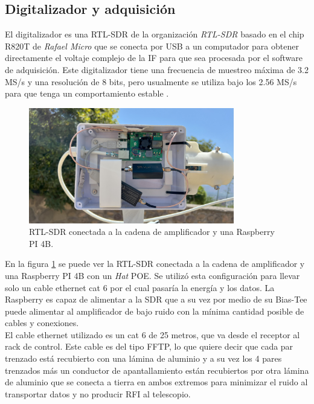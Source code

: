 \subsection{Digitalizador y adquisición}

El digitalizador es una RTL-SDR de la organización \textit{RTL-SDR} basado en el chip R820T de \textit{Rafael Micro} que se conecta por USB a un computador para obtener directamente el voltaje complejo de la IF para que sea procesada por el software de adquisición. Este digitalizador tiene una frecuencia de muestreo máxima de 3.2 MS/s y una resolución de 8 bits, pero usualmente se utiliza bajo los 2.56 MS/s para que tenga un comportamiento estable \cite{RTLSDR2018}.\\

\begin{figure}
    \centering
    \includegraphics[width=0.8\textwidth]{img/rpiRtlSaw}
    \caption{RTL-SDR conectada a la cadena de amplificador y una Raspberry PI 4B.}
    \label{fig:digitalizador}
\end{figure}

En la figura \ref{fig:digitalizador} se puede ver la RTL-SDR conectada a la cadena de amplificador y una Raspberry PI 4B con un \textit{Hat} POE. Se utilizó esta configuración para llevar solo un cable ethernet cat 6 por el cual pasaría la energía y los datos. La Raspberry es capaz de alimentar a la SDR que a su vez por medio de su Bias-Tee puede alimentar al amplificador de bajo ruido con la mínima cantidad posible de cables y conexiones.\\

El cable ethernet utilizado es un cat 6 de 25 metros, que va desde el receptor al rack de control. Este cable es del tipo FFTP, lo que quiere decir que cada par trenzado está recubierto con una lámina de aluminio y a su vez los 4 pares trenzados más un conductor de apantallamiento están recubiertos por otra lámina de aluminio que se conecta a tierra en ambos extremos para minimizar el ruido al transportar datos y no producir RFI al telescopio.\\

